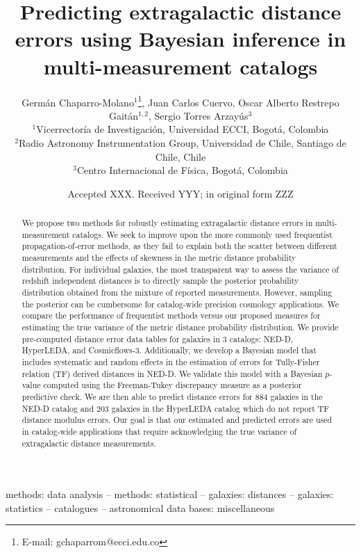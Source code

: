 \documentclass[a4paper,fleqn,usenatbib]{mnras}
\title[Predicting extragalactic distance errors]{Predicting extragalactic distance errors using Bayesian inference in multi-measurement catalogs}
\author[G. Chaparro-Molano et al.]{Germ\'an Chaparro-Molano$^{1}$\thanks{E-mail: gchaparrom@ecci.edu.co},
Juan Carlos Cuervo,
Oscar Alberto Restrepo Gait\'an$^{1,2}$, \newauthor
Sergio Torres Arzay\'{u}s$^{3}$
\\
$^{1}$Vicerrector\'ia de Investigaci\'on, Universidad ECCI, Bogot\'a, Colombia\\
$^{2}$Radio Astronomy Instrumentation Group, Universidad de Chile, Santiago de Chile, Chile\\
$^{3}$Centro Internacional de F\'isica, Bogot\'a, Colombia
}
\date{Accepted XXX. Received YYY; in original form ZZZ}
\begin{document}
\label{firstpage}
\pagerange{\pageref{firstpage}--\pageref{lastpage}}
\maketitle

\begin{abstract}
We propose two methods for robustly estimating extragalactic distance errors in multi-measurement catalogs. We seek to improve upon the more commonly used frequentist propagation-of-error methods, as they fail to explain both the scatter between different measurements and the effects of skewness in the metric distance probability distribution. For individual galaxies, the most transparent way to assess the variance of redshift independent distances is to directly sample the posterior probability distribution obtained from the mixture of reported measurements. However, sampling the posterior can be cumbersome for catalog-wide precision cosmology applications. We compare the performance of frequentist methods versus our proposed measures for estimating the true variance of the metric distance probability distribution. We provide pre-computed distance error data tables for galaxies in 3 catalogs: NED-D, HyperLEDA, and Cosmicflows-3. Additionally, we develop a Bayesian model that includes systematic and random effects in the estimation of errors for Tully-Fisher relation (TF) derived distances in NED-D. We validate this model with a Bayesian $p$-value computed using the Freeman-Tukey discrepancy measure as a posterior predictive check. We are then able to predict distance errors for 884 galaxies in the NED-D catalog and 203 galaxies in the HyperLEDA catalog which do not report TF distance modulus errors. Our goal is that our estimated and predicted errors are used in catalog-wide applications that require acknowledging the true variance of extragalactic distance measurements.
\end{abstract}

\begin{keywords}
methods: data analysis -- methods: statistical -- galaxies: distances -- galaxies: statistics -- catalogues -- astronomical data bases: miscellaneous
\end{keywords}


\end{document}
